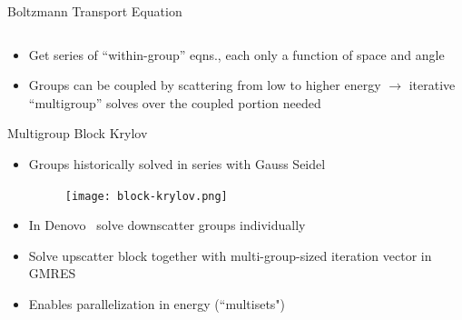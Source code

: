 \documentclass[final]{beamer}
\begin{document}
\begin{frame}{}
\begin{columns}[t]
\begin{column}{.3\linewidth}
\begin{block}{\large Boltzmann Transport Equation}
\begin{itemize}
\begin{equation}
              \label{eq:OperatorEvalForm}
            \end{equation}
            \item{Get series of ``within-group'' eqns., each only a function of space
             and angle}
            \item{Groups can be coupled by scattering from low to higher energy
             $\rightarrow$ iterative ``multigroup'' solves over the coupled portion needed}
			\end{itemize}
    			\end{block}
    	\vfill
        	\begin{block}{\large Multigroup Block Krylov \cite{Davidson2013}}		
		\begin{itemize}
		\item{Groups historically solved in series with Gauss Seidel} 
			\begin{figure}[h!]
			\centering
	      		\texttt{[image: block-krylov.png]}
			\end{figure}
		\item{In Denovo~\cite{denovo} solve downscatter groups individually}
		\item{Solve upscatter block together with multi-group-sized iteration vector 
		      in GMRES}
		\item{Enables parallelization in energy (``multisets")}
		\end{itemize}
        	\end{block}
    	\end{column}



\end{columns}
\end{frame}
\end{document}
